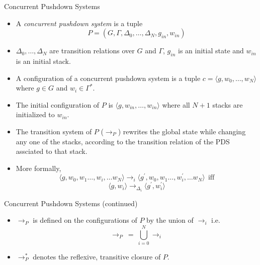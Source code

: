 \documentclass[10pt,notheorems]{beamer}
\theoremstyle{plain} %
\begin{document}
\begin{frame}{Concurrent Pushdown Systems}
    \begin{itemize}
        \item A \textit{concurrent pushdown system} is a tuple 
        \[P=(G,\Gamma,\Delta_0,\dots,\Delta_N,g_{in},w_{in})\]
        \item $\Delta_0,\dots ,\Delta_N$ are transition relations over $G$ and $\Gamma$, $g_{in}$ is an initial 
        state and $w_{in}$ is an initial stack.
        \item A configuration of a concurrent pushdown system is a tuple $c=\langle g,w_0,\dots,w_N\rangle$ where $g\in G$ and $w_i\in\Gamma^*$.
        \item The initial configuration of $P$ is $\langle g,w_{in},\dots,w_{in}\rangle$ where all $N+1$ stacks are 
        initialized to $w_{in}$.
        \item The transition system of $P$ ($\rightarrow_P$) rewrites the global state while changing any one
        of the stacks, according to the transition relation of the PDS assciated to that stack.
        \item More formally, 
        \[\langle g,w_0,w_1\dots ,w_i,\dots w_N\rangle\rightarrow_i \langle g^{\prime},w_0,w_1\dots ,w^{\prime}_i,\dots w_N\rangle\:\:\text{iff}\] 
        \[\langle g,w_i\rangle\rightarrow_{\Delta_i}\langle g^{\prime},w^{\prime}_i\rangle\]
    \end{itemize}
\end{frame}
\begin{frame}{Concurrent Pushdown Systems (continued)}
     \begin{itemize}
        \item $\rightarrow_P$ is defined on the configurations of $P$ by the union of $\rightarrow_i$ i.e.
        \[\rightarrow_P\:=\:\bigcup_{i=0}^N \rightarrow_i\]
        \item $\rightarrow^*_P$ denotes the reflexive, transitive closure of $P$.    
        
     \end{itemize} 
\end{frame}
\end{document}
